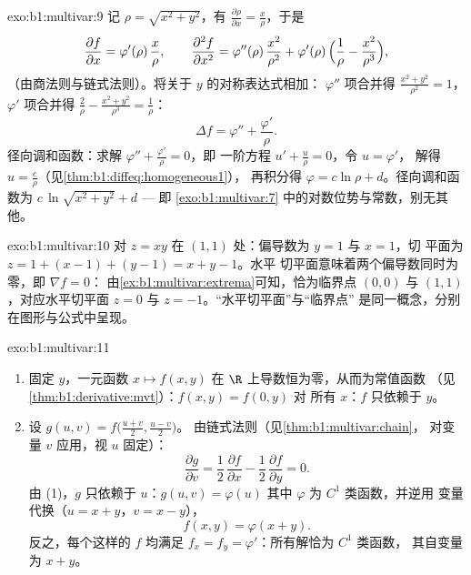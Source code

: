 \begin{solution}{exo:b1:multivar:9}
记 $\rho = \sqrt{x^2+y^2}$，有 $\frac{\partial \rho}{\partial x} =
\frac{x}{\rho}$，于是
\[
\frac{\partial f}{\partial x} = \varphi'(\rho)\,\frac{x}{\rho},
\qquad
\frac{\partial^2 f}{\partial x^2}
= \varphi''(\rho)\,\frac{x^2}{\rho^2}
+ \varphi'(\rho)\,\Bigl(\frac{1}{\rho} -
\frac{x^2}{\rho^3}\Bigr),
\]
（由商法则与链式法则）。将关于 $y$ 的对称表达式相加：
$\varphi''$ 项合并得 $\frac{x^2 + y^2}{\rho^2} = 1$，
$\varphi'$ 项合并得 $\frac{2}{\rho} - \frac{x^2 +
y^2}{\rho^3} = \frac{1}{\rho}$：
\[
\Delta f = \varphi'' + \frac{\varphi'}{\rho} .
\]
径向调和函数：求解 $\varphi'' + \frac{\varphi'}{\rho} = 0$，即
一阶方程 $u' + \frac u\rho = 0$，令 $u = \varphi'$，
解得 $u = \frac{c}{\rho}$（见\cref{thm:b1:diffeq:homogeneous1}），
再积分得 $\varphi = c\ln\rho + d$。径向调和函数为
$c\,\ln\sqrt{x^2 + y^2} + d$ --- 即
\cref{exo:b1:multivar:7} 中的对数位势与常数，别无其他。
\end{solution}

\begin{solution}{exo:b1:multivar:10}
对 $z = xy$ 在 $(1,1)$ 处：偏导数为 $y = 1$ 与 $x = 1$，切
平面为 $z = 1 + (x - 1) + (y - 1) = x + y - 1$。水平
切平面意味着两个偏导数同时为零，即 $\nabla f = 0$：
由\cref{ex:b1:multivar:extrema}可知，恰为临界点
$(0, 0)$ 与 $(1, 1)$，对应水平切平面 $z = 0$ 与 $z =
-1$。“水平切平面”与“临界点”
是同一概念，分别在图形与公式中呈现。
\end{solution}

\begin{solution}{exo:b1:multivar:11}
\begin{enumerate}
  \item 固定 $y$，一元函数 $x \mapsto
        f(x,y)$ 在 $\R$ 上导数恒为零，从而为常值函数
        （见\cref{thm:b1:derivative:mvt}）：$f(x, y) = f(0, y)$ 对
        所有 $x$：$f$ 只依赖于 $y$。
  \item 设 $g(u, v) = f\bigl(\frac{u+v}2, \frac{u-v}2\bigr)$。
        由链式法则（见\cref{thm:b1:multivar:chain}，
        对变量 $v$ 应用，视 $u$ 固定）：
        \[
        \frac{\partial g}{\partial v}
        = \frac12\,\frac{\partial f}{\partial x}
        - \frac12\,\frac{\partial f}{\partial y} = 0 .
        \]
        由 (1)，$g$ 只依赖于 $u$：$g(u, v) = \varphi(u)$
        其中 $\varphi$ 为 $C^1$ 类函数，并逆用
        变量代换（$u = x + y$，$v = x - y$），
        \[
        f(x, y) = \varphi(x + y).
        \]
        反之，每个这样的 $f$ 均满足 $f_x = f_y =
        \varphi'$：所有解恰为 $C^1$ 类函数，
        其自变量为 $x + y$。
\end{enumerate}
\end{solution}

